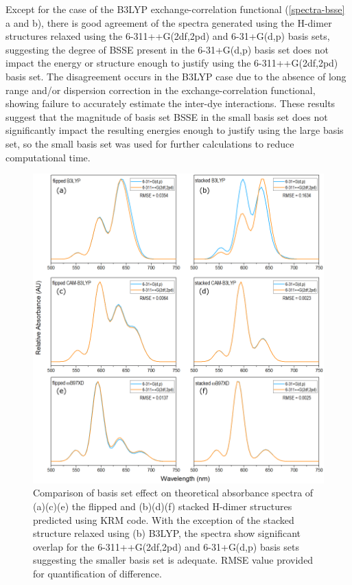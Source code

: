 Except for the case of the B3LYP exchange-correlation functional (\autoref{spectra-bsse} a and b), there is good agreement of the spectra generated using the H-dimer structures relaxed using the 6-311++G(2df,2pd) and 6-31+G(d,p) basis sets, suggesting the degree of BSSE present in the 6-31+G(d,p) basis set does not impact the energy or structure enough to justify using the 6-311++G(2df,2pd) basis set. The disagreement occurs in the B3LYP case due to the absence of long range and/or dispersion correction in the exchange-correlation functional, showing failure to accurately estimate the inter-dye interactions. These results suggest that the magnitude of basis set BSSE in the small basis set does not significantly impact the resulting energies enough to justify using the large basis set, so the small basis set was used for further calculations to reduce computational time. 
\begin{figure}[h!]
  \centering
  \includegraphics[width=0.8\linewidth]{figures/pub1/H-dimersall-af.pdf}
  \caption{Comparison of basis set effect on theoretical absorbance spectra of (a)(c)(e) the flipped and (b)(d)(f) stacked H-dimer structures predicted using KRM code. With the exception of the stacked structure relaxed using (b) B3LYP, the spectra show significant overlap for the 6-311++G(2df,2pd) and 6-31+G(d,p) basis sets suggesting the smaller basis set is adequate. RMSE value provided for quantification of difference.}\label{spectra-bsse}
\end{figure}

